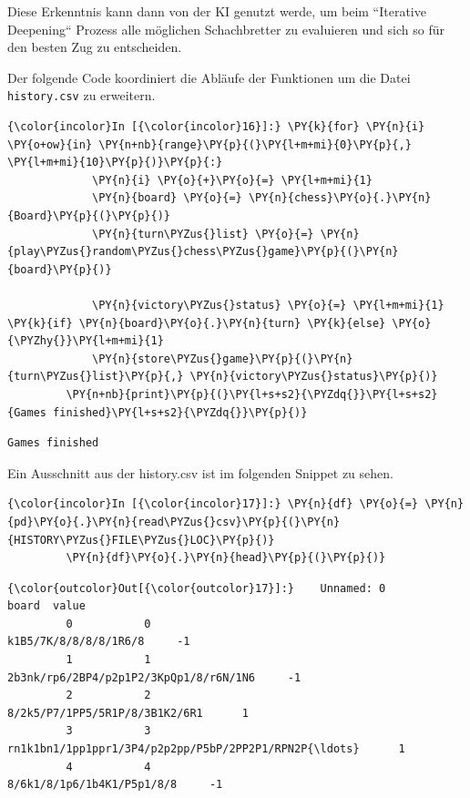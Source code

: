 Diese Erkenntnis kann dann von der KI genutzt werde, um beim ``Iterative
Deepening`` Prozess alle möglichen Schachbretter zu evaluieren und sich
so für den besten Zug zu entscheiden.

Der folgende Code koordiniert die Abläufe der Funktionen um die Datei
\texttt{history.csv} zu erweitern.

    \begin{Verbatim}[commandchars=\\\{\}]
{\color{incolor}In [{\color{incolor}16}]:} \PY{k}{for} \PY{n}{i} \PY{o+ow}{in} \PY{n+nb}{range}\PY{p}{(}\PY{l+m+mi}{0}\PY{p}{,} \PY{l+m+mi}{10}\PY{p}{)}\PY{p}{:}
             \PY{n}{i} \PY{o}{+}\PY{o}{=} \PY{l+m+mi}{1}
             \PY{n}{board} \PY{o}{=} \PY{n}{chess}\PY{o}{.}\PY{n}{Board}\PY{p}{(}\PY{p}{)}
             \PY{n}{turn\PYZus{}list} \PY{o}{=} \PY{n}{play\PYZus{}random\PYZus{}chess\PYZus{}game}\PY{p}{(}\PY{n}{board}\PY{p}{)}
         
             \PY{n}{victory\PYZus{}status} \PY{o}{=} \PY{l+m+mi}{1} \PY{k}{if} \PY{n}{board}\PY{o}{.}\PY{n}{turn} \PY{k}{else} \PY{o}{\PYZhy{}}\PY{l+m+mi}{1}
             \PY{n}{store\PYZus{}game}\PY{p}{(}\PY{n}{turn\PYZus{}list}\PY{p}{,} \PY{n}{victory\PYZus{}status}\PY{p}{)}
         \PY{n+nb}{print}\PY{p}{(}\PY{l+s+s2}{\PYZdq{}}\PY{l+s+s2}{Games finished}\PY{l+s+s2}{\PYZdq{}}\PY{p}{)}
\end{Verbatim}


    \begin{Verbatim}[commandchars=\\\{\}]
Games finished

    \end{Verbatim}

    Ein Ausschnitt aus der history.csv ist im folgenden Snippet zu sehen.

    \begin{Verbatim}[commandchars=\\\{\}]
{\color{incolor}In [{\color{incolor}17}]:} \PY{n}{df} \PY{o}{=} \PY{n}{pd}\PY{o}{.}\PY{n}{read\PYZus{}csv}\PY{p}{(}\PY{n}{HISTORY\PYZus{}FILE\PYZus{}LOC}\PY{p}{)}
         \PY{n}{df}\PY{o}{.}\PY{n}{head}\PY{p}{(}\PY{p}{)}
\end{Verbatim}


\begin{Verbatim}[commandchars=\\\{\}]
{\color{outcolor}Out[{\color{outcolor}17}]:}    Unnamed: 0                                              board  value
         0           0                              k1B5/7K/8/8/8/8/1R6/8     -1
         1           1             2b3nk/rp6/2BP4/p2p1P2/3KpQp1/8/r6N/1N6     -1
         2           2                     8/2k5/P7/1PP5/5R1P/8/3B1K2/6R1      1
         3           3  rn1k1bn1/1pp1ppr1/3P4/p2p2pp/P5bP/2PP2P1/RPN2P{\ldots}      1
         4           4                         8/6k1/8/1p6/1b4K1/P5p1/8/8     -1
\end{Verbatim}
            
